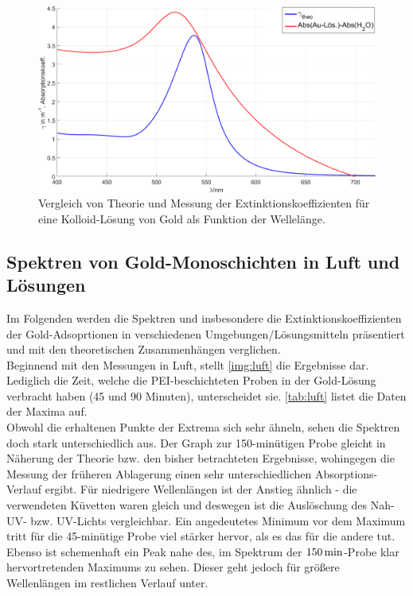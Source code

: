 \documentclass[numbers=noenddot,a4paper,notitlepage,twoside,BCOR15mm]{scrartcl}
\begin{document}
				\begin{figure}[H]
					\centering
					\includegraphics[width=\textwidth]{theo_gamma_abs_goldloes.png}
					\caption{Vergleich von Theorie und Messung der Extinktionskoeffizienten für eine Kolloid-Lösung von Gold als Funktion der Wellelänge.}
					\label{img:vergleich}
				\end{figure}

			\subsection*{Spektren von Gold-Monoschichten in Luft und Lösungen}

			Im Folgenden werden die Spektren und insbesondere die Extinktionskoeffizienten der Gold-Adsoprtionen in verschiedenen Umgebungen/Lösungsmitteln präsentiert und mit den theoretischen Zusammenhängen verglichen.\\
			Beginnend mit den Messungen in Luft, stellt \autoref{img:luft} die Ergebnisse dar. Lediglich die Zeit, welche die PEI-beschichteten Proben in der Gold-Lösung verbracht haben (45 und 90 Minuten), unterscheidet sie. \autoref{tab:luft} listet die Daten der Maxima auf.\\
			Obwohl die erhaltenen Punkte der Extrema sich sehr ähneln, sehen die Spektren doch stark unterschiedlich aus. Der Graph zur 150-minütigen Probe gleicht in Näherung der Theorie bzw. den bisher betrachteten Ergebnisse, wohingegen die Messung der früheren Ablagerung einen sehr unterschiedlichen Absorptions-Verlauf ergibt. Für niedrigere Wellenlängen ist der Anstieg ähnlich - die verwendeten Küvetten waren gleich und deswegen ist die Auslöschung des Nah-UV- bzw. UV-Lichts vergleichbar. Ein angedeutetes Minimum vor dem Maximum tritt für die 45-minütige Probe viel stärker hervor, als es das für die andere tut. Ebenso ist schemenhaft ein Peak nahe des, im Spektrum der $\unit[150]{min}$-Probe klar hervortretenden Maximums zu sehen. Dieser geht jedoch für größere Wellenlängen im restlichen Verlauf unter.
\end{document}
